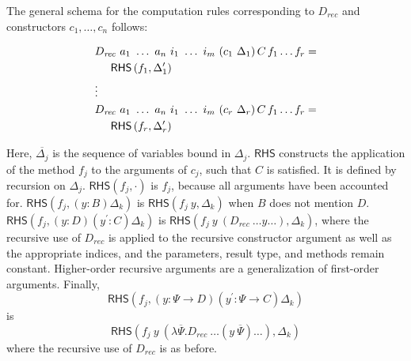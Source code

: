 \documentclass[sigplan,10pt]{acmart}
\begin{document}
The general schema for the computation rules corresponding to $D_{\mathit{rec}}$ and constructors $c_1, \ldots, c_n$ follows:

\newcommand*{\RHSap}[2]{\ensuremath{\mathsf{RHS}\left(#1, #2\right)}}
\newcommand*{\RHS}[1]{\RHSap{f_{#1}}{\Delta_{#1}^\prime}}


\begin{center}
\begingroup
\fontsize{8.9pt}{2pt}\selectfont
\begin{align*}
& D_\mathit{rec}\ a_1\ \ldots\ a_n\ i_1\ \ldots\ i_m\ (c_1\ {\Delta_1}) \, C \, f_1 \ldots f_r = \\
&\hspace{0.5cm}\RHS{1}\\
& \vdots  \\
& D_\mathit{rec}\ a_1\ \ldots\ a_n\ i_1\ \ldots\ i_m\ (c_r\ {\Delta_r}) \, C \, f_1 \ldots f_r = \\
&\hspace{0.5cm}\RHS{r}\\ 
\end{align*}
\endgroup
\end{center}
\normalsize

Here, $\overline{\Delta_j}$ is the sequence of variables bound in $\Delta_j$.
$\mathsf{RHS}$ constructs the application of the method $f_j$ to the arguments of $c_j$, such that $C$ is satisfied.
It is defined by recursion on $\Delta_j$.
$\RHSap{f_j}{\cdot}$ is $f_j$, because all arguments have been accounted for.
$\RHSap{f_j}{(y : B)\Delta_k}$ is $\RHSap{f_j\ y}{\Delta_k}$ when $B$ does not mention $D$.
$\RHSap{f_j}{(y : D) (y^\prime : C)\Delta_k}$ is $\RHSap{f_j\ y\ \left(D_{\mathit{rec}}\ \ldots y \ldots\right)}{\Delta_k}$, where the recursive use of $D_{\mathit{rec}}$ is applied to the recursive constructor argument as well as the appropriate indices, and the parameters, result type, and methods remain constant.
Higher-order recursive arguments are a generalization of first-order arguments.
Finally,
\begin{displaymath}
\RHSap{f_j}{(y : \Psi \to D) (y^\prime : \Psi \to C)\Delta_k}
\end{displaymath}
is
\begin{displaymath}
\RHSap{f_j\ y\ \left(\lambda \overline{\Psi} . D_{\mathit{rec}}\ \ldots \left(y\ \overline{\Psi} \right) \ldots\right)}{\Delta_k}
\end{displaymath}
where the recursive use of $D_{\mathit{rec}}$ is as before.
\end{document}
